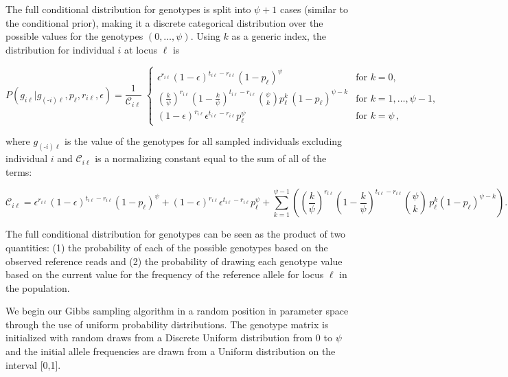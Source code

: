 \documentclass[11pt,english,letterpaper,oneside]{article}
\begin{document}
The full conditional distribution for genotypes is split into $\psi+1$ cases (similar to the conditional prior), making it a discrete categorical distribution over the possible values for the genotypes $(0,\ldots,\psi)$. Using $k$ as a generic index, the distribution for individual $i$ at locus $\ell$ is

\begin{equation}\label{G-full}
P(g_{i \ell}|g_{(\text{-}i) \ell},p_{\ell},r_{i \ell},\epsilon) = \frac{1}{\mathcal{C}_{i \ell}} \;
	\begin{cases}
	\epsilon^{r_{i \ell}}(1-\epsilon)^{t_{i \ell}-r_{i \ell}}(1-p_{\ell})^\psi & \text{for  } k = 0, \\[0.05in]
	\left(\frac{k}{\psi}\right)^{r_{i \ell}}\left(1-\frac{k}{\psi}\right)^{t_{i \ell}-r_{i \ell}}\displaystyle\binom{\psi}{k}p_{\ell}^{k}\,(1-p_{\ell})^{\psi-k} & \text{for  } k = 1,\ldots,\psi-1, \\[0.05in]
	(1-\epsilon)^{r_{i \ell}}\epsilon^{t_{i \ell}-r_{i \ell}}p_{\ell}^\psi & \text{for  } k = \psi\,,
	\end{cases} 
\end{equation}

\noindent where $g_{(\text{-}i) \ell}$ is the value of the genotypes for all sampled individuals excluding individual $i$ and $\mathcal{C}_{i \ell}$ is a normalizing constant equal to the sum of all of the terms:

\begin{equation*}
\mathcal{C}_{i \ell} = \epsilon^{r_{i \ell}}(1-\epsilon)^{t_{i \ell}-r_{i \ell}}(1-p_{\ell})^\psi + (1-\epsilon)^{r_{i \ell}}\epsilon^{t_{i \ell}-r_{i \ell}}p_{\ell}^\psi + \sum_{k=1}^{\psi-1}\left(\left(\frac{k}{\psi}\right)^{r_{i \ell}}\left(1-\frac{k}{\psi}\right)^{t_{i \ell}-r_{i \ell}}\binom{\psi}{k}\,p_{\ell}^k(1-p_{\ell})^{\psi-k}\right).
\end{equation*}

\noindent The full conditional distribution for genotypes can be seen as the product of two quantities: (1) the probability of each of the possible genotypes based on the observed  reference reads and (2) the probability of drawing each genotype value based on the current value for the frequency of the reference allele for locus $\ell$ in the population. 

We begin our Gibbs sampling algorithm in a random position in parameter space through the use of uniform probability distributions. The genotype matrix is initialized with random draws from a Discrete Uniform distribution from $0$ to $\psi$ and the initial allele frequencies are drawn from a Uniform distribution on the interval [0,1]. 
\end{document}
